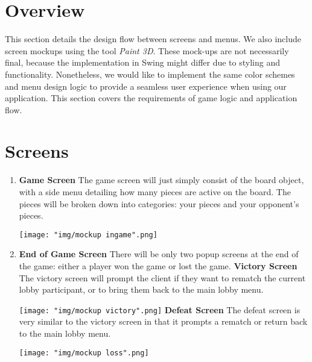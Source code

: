 \documentclass{scrreprt}
\begin{document}
	\section{Overview}
	This section details the design flow between screens and menus. We also include screen mockups using the tool \textit{Paint 3D}. These mock-ups are not necessarily final, because the implementation in Swing might differ due to styling and functionality. Nonetheless, we would like to implement the same color schemes and menu design logic to provide a seamless user experience when using our application. This section covers the requirements of game logic and application flow.

	\section{Screens}
		\begin{enumerate} [label*=\arabic*.]
		\item \textbf{Game Screen}
				The game screen will just simply consist of the board object, with a side menu detailing how many pieces are active on the board. The pieces will be broken down into categories: your pieces and your opponent's pieces.
				
\texttt{[image: "img/mockup ingame".png]}
		\item \textbf{End of Game Screen}
			There will be only two popup screens at the end of the game: either a player won the game or lost the game. 
			\subitem \textbf{Victory Screen}
				The victory screen will prompt the client if they want to rematch the current lobby participant, or to bring them back to the main lobby menu.
				
				\texttt{[image: "img/mockup victory".png]}
			\subitem \textbf{Defeat Screen}
				The defeat screen is very similar to the victory screen in that it prompts a rematch or return back to the main lobby menu.

				\texttt{[image: "img/mockup loss".png]}
		\end{enumerate}
\end{document}
